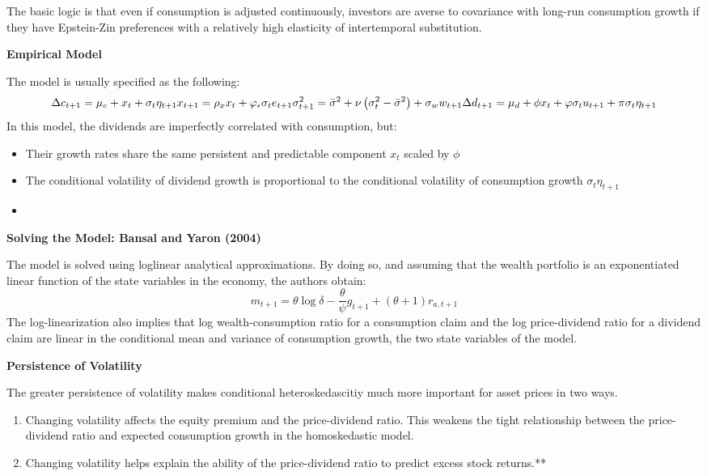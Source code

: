\documentclass[
]{book}
\providecommand{\tightlist}{%
  \setlength{\itemsep}{0pt}\setlength{\parskip}{0pt}}
\begin{document}
The basic logic is that even if consumption is adjusted continuously, investors are averse to covariance with long-run consumption growth if they have Epstein-Zin preferences with a relatively high elasticity of intertemporal substitution.

\textbf{Empirical Model}

The model is usually specified as the following:
\[
\Delta c_{t+1}=\mu_{c}+x_{t}+\sigma_{t}\eta_{t+1}\\
x_{t+1}=\rho_{x}x_{t}+\varphi_{\epsilon}\sigma_{t}e_{t+1}\\
\sigma_{t+1}^{2}=\bar{\sigma}^{2}+\nu\left(\sigma_{t}^{2}-\bar{\sigma}^{2}\right)+\sigma_{w}w_{t+1}\\
\Delta d_{t+1}=\mu_{d}+\phi x_{t}+\varphi\sigma_{t}u_{t+1}+\pi\sigma_{t}\eta_{t+1}
\]
In this model, the dividends are imperfectly correlated with consumption, but:

\begin{itemize}
\tightlist
\item
  Their growth rates share the same persistent and predictable component \(x_t\) scaled by \(\phi\)
\item
  The conditional volatility of dividend growth is proportional to the conditional volatility of consumption growth \(\sigma_t \eta_{t+1}\)
\item
\end{itemize}

\textbf{Solving the Model: Bansal and Yaron (2004)}

The model is solved using loglinear analytical approximations. By doing so, and assuming that the wealth portfolio is an exponentiated linear function of the state variables in the economy, the authors obtain:
\[
m_{t+1}=\theta\log\delta-\frac{\theta}{\psi}g_{t+1}+\left(\theta+1\right)r_{a,t+1}
\]
The log-linearization also implies that log wealth-consumption ratio for a consumption claim and the log price-dividend ratio for a dividend claim are linear in the conditional mean and variance of consumption growth, the two state variables of the model.

\textbf{Persistence of Volatility}

The greater persistence of volatility makes conditional heteroskedascitiy much more important for asset prices in two ways.

\begin{enumerate}
\def\labelenumi{\arabic{enumi}.}
\tightlist
\item
  Changing volatility affects the equity premium and the price-dividend ratio. This weakens the tight relationship between the price-dividend ratio and expected consumption growth in the homoskedastic model.
\item
  Changing volatility helps explain the ability of the price-dividend ratio to predict excess stock returns.**
\end{enumerate}
\end{document}
